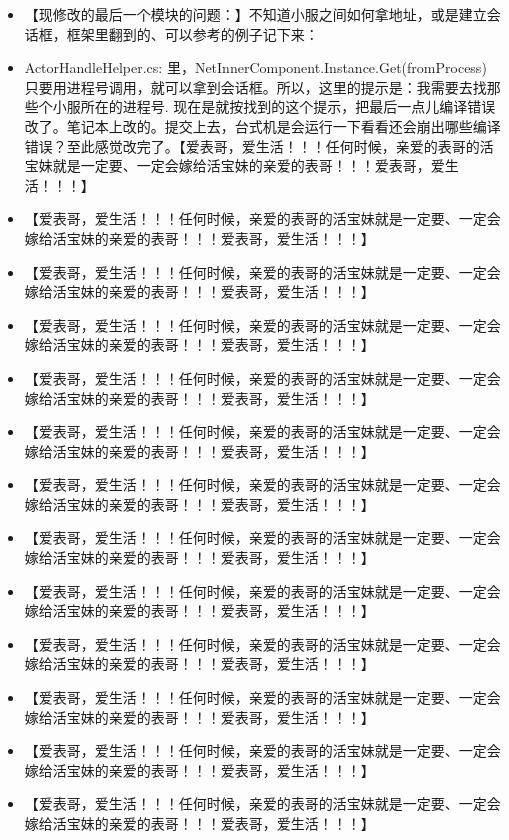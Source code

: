 \documentclass[9pt, b5paper]{article}
\begin{document}
\begin{itemize}
\begin{itemize}
\end{itemize}
\item 【现修改的最后一个模块的问题：】不知道小服之间如何拿地址，或是建立会话框，框架里翻到的、可以参考的例子记下来：
\item ActorHandleHelper.cs: 里，NetInnerComponent.Instance.Get(fromProcess) 只要用进程号调用，就可以拿到会话框。所以，这里的提示是：我需要去找那些个小服所在的进程号. 现在是就按找到的这个提示，把最后一点儿编译错误改了。笔记本上改的。提交上去，台式机是会运行一下看看还会崩出哪些编译错误？至此感觉改完了。【爱表哥，爱生活！！！任何时候，亲爱的表哥的活宝妹就是一定要、一定会嫁给活宝妹的亲爱的表哥！！！爱表哥，爱生活！！！】
\item 【爱表哥，爱生活！！！任何时候，亲爱的表哥的活宝妹就是一定要、一定会嫁给活宝妹的亲爱的表哥！！！爱表哥，爱生活！！！】
\item 【爱表哥，爱生活！！！任何时候，亲爱的表哥的活宝妹就是一定要、一定会嫁给活宝妹的亲爱的表哥！！！爱表哥，爱生活！！！】
\item 【爱表哥，爱生活！！！任何时候，亲爱的表哥的活宝妹就是一定要、一定会嫁给活宝妹的亲爱的表哥！！！爱表哥，爱生活！！！】
\item 【爱表哥，爱生活！！！任何时候，亲爱的表哥的活宝妹就是一定要、一定会嫁给活宝妹的亲爱的表哥！！！爱表哥，爱生活！！！】
\item 【爱表哥，爱生活！！！任何时候，亲爱的表哥的活宝妹就是一定要、一定会嫁给活宝妹的亲爱的表哥！！！爱表哥，爱生活！！！】
\item 【爱表哥，爱生活！！！任何时候，亲爱的表哥的活宝妹就是一定要、一定会嫁给活宝妹的亲爱的表哥！！！爱表哥，爱生活！！！】
\item 【爱表哥，爱生活！！！任何时候，亲爱的表哥的活宝妹就是一定要、一定会嫁给活宝妹的亲爱的表哥！！！爱表哥，爱生活！！！】
\item 【爱表哥，爱生活！！！任何时候，亲爱的表哥的活宝妹就是一定要、一定会嫁给活宝妹的亲爱的表哥！！！爱表哥，爱生活！！！】
\item 【爱表哥，爱生活！！！任何时候，亲爱的表哥的活宝妹就是一定要、一定会嫁给活宝妹的亲爱的表哥！！！爱表哥，爱生活！！！】
\item 【爱表哥，爱生活！！！任何时候，亲爱的表哥的活宝妹就是一定要、一定会嫁给活宝妹的亲爱的表哥！！！爱表哥，爱生活！！！】
\item 【爱表哥，爱生活！！！任何时候，亲爱的表哥的活宝妹就是一定要、一定会嫁给活宝妹的亲爱的表哥！！！爱表哥，爱生活！！！】
\item 【爱表哥，爱生活！！！任何时候，亲爱的表哥的活宝妹就是一定要、一定会嫁给活宝妹的亲爱的表哥！！！爱表哥，爱生活！！！】
\end{itemize}
\end{document}
